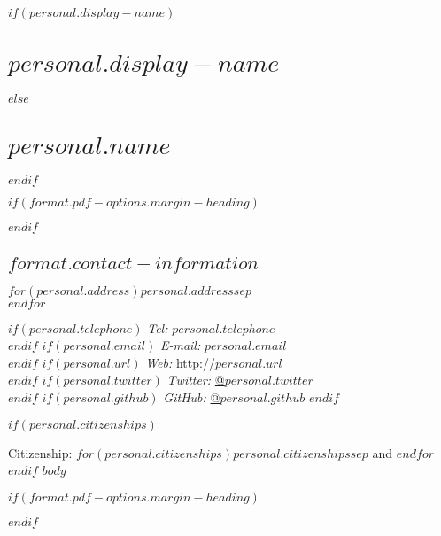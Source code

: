 \documentclass[%
  $if(format.pdf-options.papersize)$
    $format.pdf-options.papersize$paper,
  $endif$
  $format.pdf-options.typesize$,
  oneside
  ]{memoir}
\let\oldsection\section
\renewcommand{\section}[1]{%
  \oldsection*{#1}
  \leavevmode
  \par
  \vspace{\dimexpr-\baselineskip-\parskip}
}
\begin{document}
  $if(personal.display-name)$
    \chapter*{$personal.display-name$}
  $else$
    \chapter*{$personal.name$}
  $endif$

$if(format.pdf-options.margin-heading)$
  \begin{adjustwidth*}{9em}{0em}
  \mbox{}
$endif$

  \hypertarget{contact-information}{
  \section{$format.contact-information$}\label{contact-information}}
    \begin{minipage}[t]{0.3\textwidth}
      $for(personal.address)$$personal.address$$sep$\\ $endfor$
    \end{minipage}
    \begin{minipage}[t]{0.7\textwidth}
        $if(personal.telephone)$
        {\textit{Tel:}} $personal.telephone$ \\
        $endif$
        $if(personal.email)$
        {\textit{E-mail:}} $personal.email$ \\
        $endif$
        $if(personal.url)$
        {\textit{Web:}} http://$personal.url$ \\
        $endif$
        $if(personal.twitter)$
        {\textit{Twitter:}} \href{http://twitter.com/$personal.twitter$}{@$personal.twitter$} \\
        $endif$
        $if(personal.github)$
        {\textit{GitHub:}} \href{http://github.com/$personal.github$}{@$personal.github$}
        $endif$
    \end{minipage}
  $if(personal.citizenships)$
    \medskip%
    \par Citizenship:
    $for(personal.citizenships)$$personal.citizenships$$sep$ and $endfor$
  $endif$
$body$

$if(format.pdf-options.margin-heading)$
  \end{adjustwidth*}
$endif$
\end{document}

